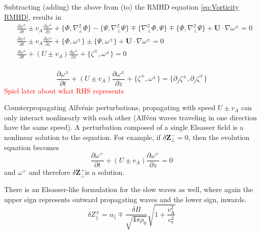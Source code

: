 Subtracting (adding) the above from (to) the RMHD equation \eqref{eq:Vorticity RMHD}, results in
\begin{equation*}
\begin{split}
    &\frac{\partial \omega^{\pm}}{\partial t}  \pm v_{A} \frac{\partial\omega^{\pm}}{\partial z} +\{\Phi, \nabla_{\perp}^{2} \Phi\} - \{\Psi, \nabla_{\perp}^{2} \Psi\} \mp \{\nabla^2_{\perp}\Phi, \Psi\} \mp \{\Phi, \nabla^2_{\perp}\Psi\}+ \boldsymbol{U}\cdot\nabla \omega^{\pm} = 0\\
     &\frac{\partial \omega^{\pm}}{\partial t}  \pm v_{A} \frac{\partial\omega^{\pm}}{\partial z} +\{\Phi, \omega^{\pm}\} \pm \{\Psi, \omega^{\pm}\}  + \boldsymbol{U}\cdot\nabla \omega^{\pm} = 0\\
     &\frac{\partial \omega^{\pm}}{\partial t}  + (U\pm v_{A})\frac{\partial\omega^{\pm}}{\partial z} + \{\zeta^{\mp}, \omega^{\pm}\} = 0\\
\end{split}
\end{equation*}

\begin{equation}
    \frac{\partial \omega^{\pm}}{\partial t} +(U\pm v_{A})\frac{\partial \omega^{\pm}}{\partial z} + \{\zeta^{\mp}, \omega^{\pm}\} = \{\partial_j \zeta^{\pm}, \partial_j \zeta^{\mp}\} 
    \label{eq:RMHD Elsasser}
\end{equation}
\textcolor{red}{Spiel later about what RHS represents}

Counterpropagating Alfv\'enic perturbations, propagating with speed \(U\pm v_A\) can only interact nonlinearly with each other (Alf\'ven waves traveling in one direction have the same speed). A perturbation composed of a single Elsasser field is a nonlinear solution to the equation. For example, if \(\delta\boldsymbol{Z}^-_{\perp}=0\), then the evolution equation becomes
\begin{equation*}
    \frac{\partial \omega^{+}}{\partial t} +(U\pm v_{A})\frac{\partial \omega^{+}}{\partial z} =0 
\end{equation*}
and \(\omega^{+}\) and therefore \(\delta\boldsymbol{Z}^+_{\perp}\)is a solution.

There is an Elsasser-like formulation for the slow waves as well, where again the upper sign represents outward propagating waves and the lower sign, inwards.
\begin{equation}
    \delta Z_{\parallel}^{\pm} = u_{\parallel} \mp \frac{\delta B}{\sqrt{4\pi \rho_0}} \sqrt{1 + \frac{v_{\mathrm{A}}^{2}}{c_{\mathrm{s}}^{2}}}
    \label{eq:Elsasser-like}
\end{equation}

